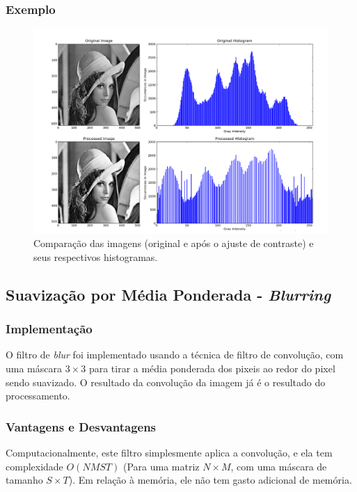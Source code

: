 \subsubsection{Exemplo}
\begin{figure}[htb]
    \centering
    \includegraphics[width=1.0\textwidth]{contrast_example.png}
    \caption{Comparação das imagens (original e após o ajuste de contraste) e seus respectivos histogramas.}
    \label{fig:ex_contraste}
\end{figure}

\subsection{Suavização por Média Ponderada - \textit{Blurring}}
\subsubsection{Implementação}
O filtro de \textit{blur} foi implementado usando a técnica de filtro de convolução, com uma máscara $3\times 3$ para tirar
a média ponderada dos pixeis ao redor do pixel sendo suavizado. O resultado da convolução da imagem já é o resultado
do processamento.

\subsubsection{Vantagens e Desvantagens}
Computacionalmente, este filtro simplesmente aplica a convolução, e ela tem complexidade $O(NMST)$ (Para uma matriz 
$N\times M$, com uma máscara de tamanho $S\times T$). Em relação à memória, ele não tem gasto adicional de memória.

